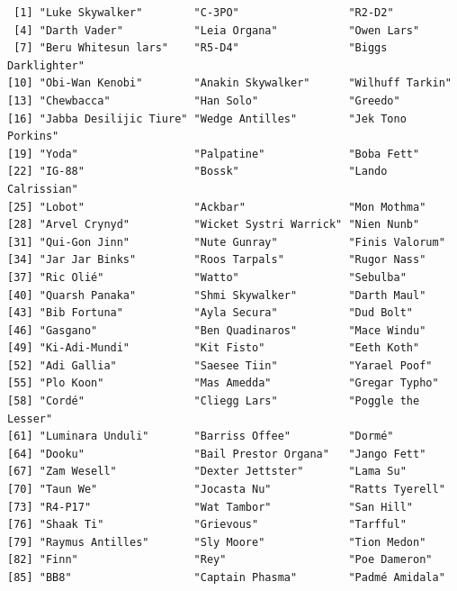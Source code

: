 \documentclass[
  letterpaper,
  DIV=11,
  numbers=noendperiod]{scrreprt}
\newenvironment{Shaded}{\begin{snugshade}}{\end{snugshade}}
\newcommand{\NormalTok}[1]{\textcolor[rgb]{0.00,0.23,0.31}{#1}}
\newcommand{\SpecialCharTok}[1]{\textcolor[rgb]{0.37,0.37,0.37}{#1}}
\newcommand{\StringTok}[1]{\textcolor[rgb]{0.13,0.47,0.30}{#1}}
\begin{document}
\begin{Shaded}
\end{Shaded}

\begin{verbatim}
 [1] "Luke Skywalker"        "C-3PO"                 "R2-D2"                
 [4] "Darth Vader"           "Leia Organa"           "Owen Lars"            
 [7] "Beru Whitesun lars"    "R5-D4"                 "Biggs Darklighter"    
[10] "Obi-Wan Kenobi"        "Anakin Skywalker"      "Wilhuff Tarkin"       
[13] "Chewbacca"             "Han Solo"              "Greedo"               
[16] "Jabba Desilijic Tiure" "Wedge Antilles"        "Jek Tono Porkins"     
[19] "Yoda"                  "Palpatine"             "Boba Fett"            
[22] "IG-88"                 "Bossk"                 "Lando Calrissian"     
[25] "Lobot"                 "Ackbar"                "Mon Mothma"           
[28] "Arvel Crynyd"          "Wicket Systri Warrick" "Nien Nunb"            
[31] "Qui-Gon Jinn"          "Nute Gunray"           "Finis Valorum"        
[34] "Jar Jar Binks"         "Roos Tarpals"          "Rugor Nass"           
[37] "Ric Olié"              "Watto"                 "Sebulba"              
[40] "Quarsh Panaka"         "Shmi Skywalker"        "Darth Maul"           
[43] "Bib Fortuna"           "Ayla Secura"           "Dud Bolt"             
[46] "Gasgano"               "Ben Quadinaros"        "Mace Windu"           
[49] "Ki-Adi-Mundi"          "Kit Fisto"             "Eeth Koth"            
[52] "Adi Gallia"            "Saesee Tiin"           "Yarael Poof"          
[55] "Plo Koon"              "Mas Amedda"            "Gregar Typho"         
[58] "Cordé"                 "Cliegg Lars"           "Poggle the Lesser"    
[61] "Luminara Unduli"       "Barriss Offee"         "Dormé"                
[64] "Dooku"                 "Bail Prestor Organa"   "Jango Fett"           
[67] "Zam Wesell"            "Dexter Jettster"       "Lama Su"              
[70] "Taun We"               "Jocasta Nu"            "Ratts Tyerell"        
[73] "R4-P17"                "Wat Tambor"            "San Hill"             
[76] "Shaak Ti"              "Grievous"              "Tarfful"              
[79] "Raymus Antilles"       "Sly Moore"             "Tion Medon"           
[82] "Finn"                  "Rey"                   "Poe Dameron"          
[85] "BB8"                   "Captain Phasma"        "Padmé Amidala"        
\end{verbatim}
\end{document}
